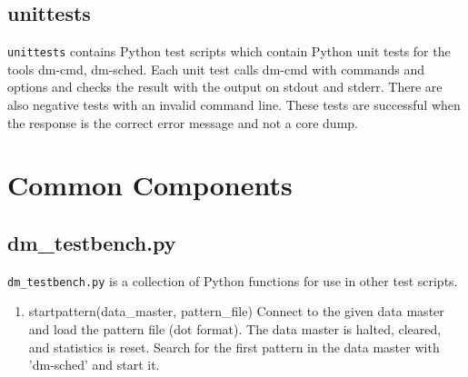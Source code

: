 \documentclass[12pt,a4paper]{report}
\begin{document}
\section{unittests}
\texttt{unittests} contains Python test scripts which contain Python unit tests for the tools dm-cmd, dm-sched. Each unit test calls dm-cmd 
with commands and options and checks the result with the output on stdout and stderr. There are also negative tests with an invalid command 
line. These tests are successful when the response is the correct error message and not a core dump.
\chapter{Common Components}
\section{dm\_testbench.py}
\texttt{dm\_testbench.py} is a collection of Python functions for use in other test scripts.
\begin{enumerate}
\item startpattern(data\_master, pattern\_file)
    Connect to the given data master and load the pattern file (dot format).
    The data master is halted, cleared, and statistics is reset.
    Search for the first pattern in the data master with 'dm-sched' and start it.
\end{enumerate}
\end{document}
